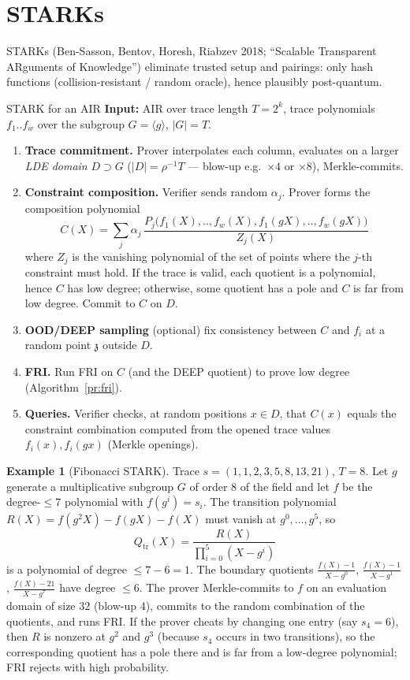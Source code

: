 \documentclass[11pt,a4paper]{report}
\theoremstyle{plain}
\theoremstyle{definition}
\newtheorem{example}[theorem]{Example}
\theoremstyle{remark}
\begin{document}
\section{STARKs}
STARKs (Ben-Sasson, Bentov, Horesh, Riabzev 2018; ``Scalable Transparent ARguments of Knowledge'') eliminate trusted setup and pairings: only hash functions (collision-resistant / random oracle), hence plausibly post-quantum.
\begin{algorithm}[label=pr:stark]{STARK for an AIR}
\textbf{Input:} AIR over trace length $T=2^k$, trace polynomials $f_1..f_w$ over the subgroup $G=\langle g\rangle$, $|G|=T$.
\begin{enumerate}
\item \textbf{Trace commitment.} Prover interpolates each column, evaluates on a larger \emph{LDE domain} $D\supset G$ ($|D|=\rho^{-1}T$ — blow-up e.g.\ $\times4$ or $\times8$), Merkle-commits.
\item \textbf{Constraint composition.} Verifier sends random $\alpha_j$. Prover forms the composition polynomial
\[C(X)=\sum_j\alpha_j\,\frac{P_j\big(f_1(X),..,f_w(X),f_1(gX),..,f_w(gX)\big)}{Z_j(X)}\]
where $Z_j$ is the vanishing polynomial of the set of points where the $j$-th constraint must hold. If the trace is valid, each quotient is a polynomial, hence $C$ has low degree; otherwise, some quotient has a pole and $C$ is far from low degree. Commit to $C$ on $D$.
\item \textbf{OOD/DEEP sampling} (optional) fix consistency between $C$ and $f_i$ at a random point $\mathfrak z$ outside $D$.
\item \textbf{FRI.} Run FRI on $C$ (and the DEEP quotient) to prove low degree (Algorithm~\ref{pr:fri}).
\item \textbf{Queries.} Verifier checks, at random positions $x\in D$, that $C(x)$ equals the constraint combination computed from the opened trace values $f_i(x),f_i(gx)$ (Merkle openings).
\end{enumerate}
\end{algorithm}
\begin{example}[Fibonacci STARK]
Trace $s=(1,1,2,3,5,8,13,21)$, $T=8$. Let $g$ generate a multiplicative subgroup $G$ of order $8$ of the field and let $f$ be the degree-$\le7$ polynomial with $f(g^i)=s_i$. The transition polynomial $R(X)=f(g^2X)-f(gX)-f(X)$ must vanish at $g^0,\dots,g^5$, so
\[Q_{\mathrm{tr}}(X)=\frac{R(X)}{\prod_{i=0}^{5}(X-g^i)}\]
is a polynomial of degree $\le7-6=1$. The boundary quotients $\frac{f(X)-1}{X-g^0}$, $\frac{f(X)-1}{X-g^1}$, $\frac{f(X)-21}{X-g^7}$ have degree $\le6$. The prover Merkle-commits to $f$ on an evaluation domain of size $32$ (blow-up $4$), commits to the random combination of the quotients, and runs FRI. If the prover cheats by changing one entry (say $s_4=6$), then $R$ is nonzero at $g^2$ and $g^3$ (because $s_4$ occurs in two transitions), so the corresponding quotient has a pole there and is far from a low-degree polynomial; FRI rejects with high probability.
\end{example}
\end{document}
